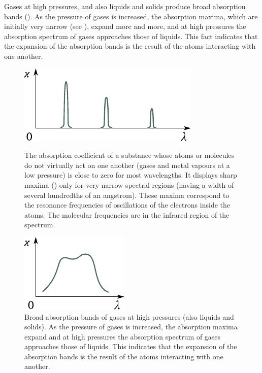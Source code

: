Gases at high pressures, and also liquids and solids produce broad absorption bands ().
As the pressure of gases is increased, the absorption maxima, which are initially very narrow (see ), expand more and more, and at high pressures the absorption spectrum of gases approaches those of liquids.
This fact indicates that the expansion of the absorption bands is the result of the atoms interacting with one another.

\begin{figure}[t]
	\begin{minipage}[t]{0.56\linewidth}
		\begin{center}
			\includegraphics[scale=1]{figures/ch_20/fig_20_7.pdf}
            \caption[]{The absorption coefficient of a substance whose atoms or molecules do not virtually act on one another (gases and metal vapours at a low pressure) is close to zero for most wavelengths. It displays sharp maxima () only for very narrow spectral regions (having a width of several hundredths of an angstrom). These maxima correspond to the resonance frequencies of oscillations of the electrons inside the atoms. The molecular frequencies are in the infrared region of the spectrum.}
			\label{fig:20_7}
		\end{center}
	\end{minipage}
	\hfill{ }%
	\begin{minipage}[t]{0.40\linewidth}
		\begin{center}
			\includegraphics[scale=1]{figures/ch_20/fig_20_8.pdf}
			\caption[]{Broad absorption bands of gases at high pressures (also liquids and solids). As the pressure of gases is increased, the absorption maxima expand and at high pressures the absorption spectrum of gases approaches those of liquids. This indicates that the expansion of the absorption bands is the result of the atoms interacting with one another.}
			\label{fig:20_8}
		\end{center}
	\end{minipage}
\vspace{-0.4cm}
\end{figure}

